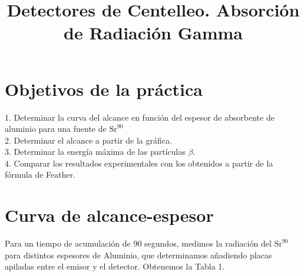 \documentclass[a4paper,12pt,spanish]{article}
\begin{document}
	
	
	\title{ Detectores de Centelleo. Absorción de Radiación Gamma}
	
	\date{}
	
	\maketitle
	
	
	\section{Objetivos de la práctica}
	
	\vspace{\baselineskip}
	
	1. Determinar la curva del alcance en función del espesor de absorbente de aluminio para una fuente de $\text{Sr}^{90}$\\
	
	2. Determinar el alcance a partir de la gráfica.\\
	
	3. Determinar la energía máxima de las partículas $\beta$.\\
	
	4. Comparar los resultados experimentales con los obtenidos a partir de la fórmula de Feather.\\
	
	
	
	
	
	\section{Curva de alcance-espesor}
	
	Para un tiempo de acumulación de 90 segundos, medimos la radiación del $\text{Sr}^{90}$ para distintos espesores de Aluminio, que determinamos añadiendo placas apiladas entre el emisor y el detector. Obtenemos la Tabla 1. 
	
	
	
\end{document}
